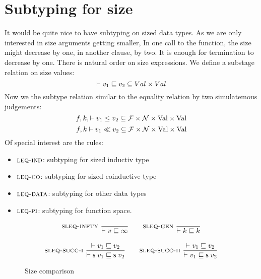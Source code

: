 \section{Subtyping for size}
It would be quite nice to have subtyping on sized data types.
As we are only interested in size arguments getting smaller, 
In one call to the function, the size might decrease by one, in another clause, by two.
It is enough for termination to decrease by one.
There is natural order on size expressions.
We define a substage relation on size values:
\[\vdash v_1\sqsubseteq v_2 \subseteq Val \times Val \]
Now we the subtype relation similar to the equality relation by two simulatemous judgements:
\[f,k,\vdash v_1\leq v_2 \subseteq \mathcal{F} \times \mathcal{N} \times \mathrm{Val} \times \mathrm{Val} \]
\[f,k\vdash v_1{\;\ll\;}v_2 \subseteq \mathcal{F} \times \mathcal{N} \times\mathrm{Val} \times \mathrm{Val} \]
Of special interest are the rules:
\begin{itemize}
\item
$\mbox{\sc leq-ind}$: subtyping for sized inductiv type 
\item
$\mbox{\sc leq-co}$: subtyping for sized coinductive type
\item
$\mbox{\sc leq-data}$: subtyping for other data types
\item
$\mbox{\sc leq-pi}$: subtyping for function space. 
\end{itemize}
\begin{figure}[p]
\begin{gather*}
\mbox{\sc sleq-infty}\ \dfrac{}{\vdash v\sqsubseteq\infty}
\qquad
\mbox{\sc sleq-gen}\ \dfrac{}{\vdash k\sqsubseteq k}
\\[2ex]
\mbox{\sc sleq-succ-i}\ \dfrac{\vdash v_1\sqsubseteq v_2}{\vdash\mathsf{s}\; v_1\sqsubseteq\mathsf{s}\; v_2}
\qquad
\mbox{\sc sleq-succ-ii}\ \dfrac{\vdash v_1\sqsubseteq v_2}{\vdash v_1\sqsubseteq\mathsf{s}\; v_2}
\end{gather*}
\caption{Size comparison}
\end{figure}

